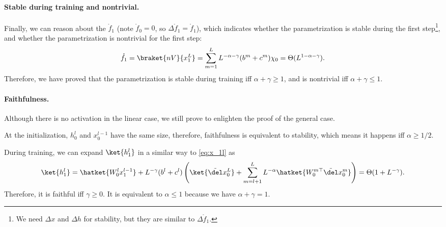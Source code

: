 \paragraph{Stable during training and nontrivial.} Finally, we can reason about the $\mathring f_1$ (note $\mathring f_0=0$, so $\Delta \mathring f_1=\mathring f_1$), which indicates whether the parametrization is stable during the first step\footnote{We need $\Delta x$ and $\Delta h$ for stability, but they are similar to $\Delta \mathring f_1$.}, and whether the parametrization is nontrivial for the first step:
\[\mathring f_1 = \braket{nV}{x_1^L} = \sum_{m=1}^L L^{-\alpha-\gamma} (b^m+c^m) \chi_0=\Theta(L^{1-\alpha-\gamma}).\]
Therefore, we have proved  that the parametrization is stable during training iff $\alpha + \gamma \geq 1$, and is nontrivial iff $\alpha + \gamma \leq 1$.

\paragraph{Faithfulness.} Although there is no activation in the linear case, we still prove  to enlighten the proof of the general case. 

At the initialization, $h_0^l$ and $x_0^{l-1}$ have the same size, therefore, faithfulness is equivalent to stability, which means it happens iff $\alpha \geq 1/2$.

During training, we can expand $\ket{h_1^l}$ in a similar way to \cref{eq:x_1l} as
\[\ket{h_1^l}=\hatket{W_0^l x_1^{l-1}} + L^{-\gamma} (b^l+c^l)\left(\ket{\tilde \del x_0^L} + \sum_{m=l+1}^L L^{-\alpha} \hatket{W_0^{m\top} \tilde \del x_0^m}\right)=\Theta(1+L^{-\gamma}).\]
Therefore, it is faithful iff $\gamma\geq 0$. It is equivalent to $\alpha\leq 1$ because we have $\alpha+\gamma=1$.

